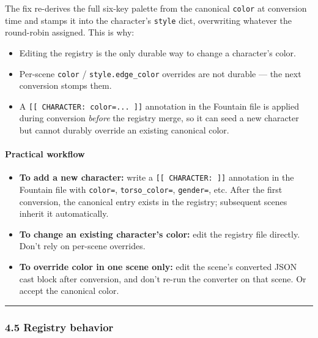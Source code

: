\documentclass[
  11pt,
]{book}
\providecommand{\tightlist}{%
  \setlength{\itemsep}{0pt}\setlength{\parskip}{0pt}}
\begin{document}
The fix re-derives the full six-key palette from the canonical
\texttt{color} at conversion time and stamps it into the character's
\texttt{style} dict, overwriting whatever the round-robin assigned. This
is why:

\begin{itemize}
\tightlist
\item
  Editing the registry is the only durable way to change a character's
  color.
\item
  Per-scene \texttt{color} / \texttt{style.edge\_color} overrides are
  not durable --- the next conversion stomps them.
\item
  A \texttt{{[}{[}\ CHARACTER:\ color=...\ {]}{]}} annotation in the
  Fountain file is applied during conversion \emph{before} the registry
  merge, so it can seed a new character but cannot durably override an
  existing canonical color.
\end{itemize}

\paragraph{Practical workflow}\label{practical-workflow}

\begin{itemize}
\tightlist
\item
  \textbf{To add a new character:} write a
  \texttt{{[}{[}\ CHARACTER:\ {]}{]}} annotation in the Fountain file
  with \texttt{color=}, \texttt{torso\_color=}, \texttt{gender=}, etc.
  After the first conversion, the canonical entry exists in the
  registry; subsequent scenes inherit it automatically.
\item
  \textbf{To change an existing character's color:} edit the registry
  file directly. Don't rely on per-scene overrides.
\item
  \textbf{To override color in one scene only:} edit the scene's
  converted JSON cast block after conversion, and don't re-run the
  converter on that scene. Or accept the canonical color.
\end{itemize}

\begin{center}\rule{0.5\linewidth}{0.5pt}\end{center}

\subsubsection{4.5 Registry behavior}\label{registry-behavior}
\end{document}
